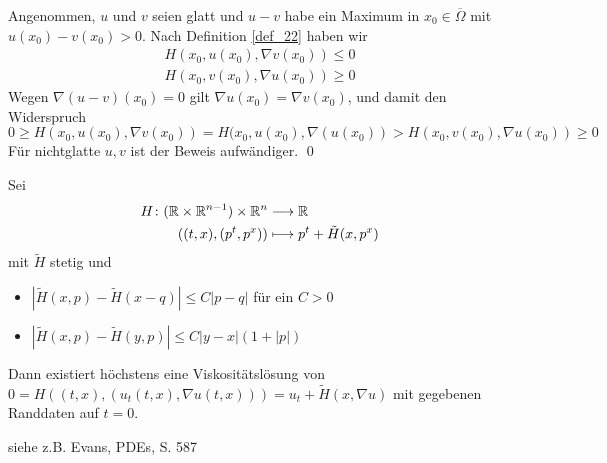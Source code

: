 	Angenommen, $u$ und $v$ seien glatt und $u-v$ habe ein Maximum in $x_0 \in \overline{\Omega}$ mit $u(x_0) - v(x_0) > 0$. Nach Definition \ref{def_22} haben wir
	\[ \begin{array}{c}
		H(x_0,u(x_0),\nabla v(x_0)) \leq 0 \\
		H(x_0,v(x_0),\nabla u(x_0)) \geq 0
	\end{array}\]
	Wegen $\nabla(u-v)(x_0) = 0$ gilt $\nabla u(x_0) = \nabla v(x_0)$, und damit den Widerspruch
	\[ 0 \geq H(x_0,u(x_0),\nabla v(x_0)) = H(x_0,u(x_0),\nabla(u(x_0)) > H(x_0,v(x_0),\nabla u(x_0)) \geq 0 \]
	Für nichtglatte $u,v$ ist der Beweis aufwändiger. \qed
	
\begin{thm} \label{thm_35}
	Sei \marginnote{[35]}
	\begin{equation}
	\begin{aligned}
		H\colon (\mathbb{R} \times \mathbb{R}^{n-1}) \times \mathbb{R}^n &\longrightarrow \mathbb{R} \\ \notag
		((t,x),(p^t,p^x)) &\longmapsto p^t + \tilde{H}(x,p^x)
	\end{aligned}
	\end{equation}
	mit $\tilde{H}$ stetig und \begin{itemize}
		\item $|\tilde{H}(x,p) - \tilde{H}(x-q)| \leq C|p-q|$ für ein $C > 0$
		\item $|\tilde{H}(x,p) - \tilde{H}(y,p)| \leq C|y-x|(1+|p|)$
	\end{itemize}
	Dann existiert höchstens eine Viskositätslösung von $0 = H((t,x),(u_t(t,x),\nabla u(t,x))) = u_t + \tilde{H}(x,\nabla u)$ mit gegebenen Randdaten auf $t = 0$.
\end{thm}

	siehe z.B. Evans, \glqq PDEs\grqq, S. 587 
\newpage